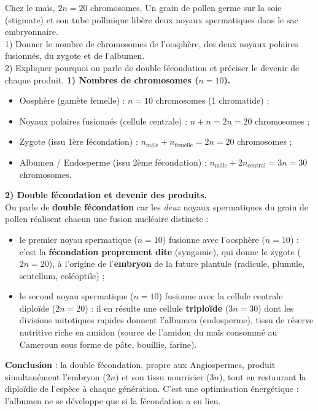 \documentclass[11pt]{article}
\newcommand{\cle}[1]{{\popxbold\color{popdark}#1}}
\begin{document}
\begin{exoresolu}
Chez le maïs, $2n = 20$ chromosomes. Un grain de pollen germe sur la soie (stigmate) et son tube pollinique libère deux noyaux spermatiques dans le sac embryonnaire.\\
1) Donner le nombre de chromosomes de l'oosphère, des deux noyaux polaires fusionnés, du zygote et de l'albumen.\\
2) Expliquer pourquoi on parle de double fécondation et préciser le devenir de chaque produit.
\tcblower
\textbf{1) Nombres de chromosomes ($n = 10$).}
\begin{itemize}
\item Oosphère (gamète femelle) : $n = 10$ chromosomes (1 chromatide) ;
\item Noyaux polaires fusionnés (cellule centrale) : $n + n = 2n = 20$ chromosomes ;
\item Zygote (issu 1ère fécondation) : $n_{\text{mâle}} + n_{\text{femelle}} = 2n = 20$ chromosomes ;
\item Albumen / Endosperme (issu 2ème fécondation) : $n_{\text{mâle}} + 2n_{\text{central}} = 3n = 30$ chromosomes.
\end{itemize}
\textbf{2) Double fécondation et devenir des produits.}\\
On parle de \textbf{double fécondation} car les \emph{deux} noyaux spermatiques du grain de pollen réalisent chacun une fusion nucléaire distincte :
\begin{itemize}
\item le premier noyau spermatique ($n = 10$) fusionne avec l'oosphère ($n = 10$) : c'est la \textbf{fécondation proprement dite} (syngamie), qui donne le \cle{zygote} ($2n = 20$), à l'origine de l'\textbf{embryon} de la future plantule (radicule, plumule, scutellum, coléoptile) ;
\item le second noyau spermatique ($n = 10$) fusionne avec la cellule centrale diploïde ($2n = 20$) : il en résulte une cellule \textbf{triploïde} ($3n = 30$) dont les divisions mitotiques rapides donnent l'\cle{albumen} (endosperme), tissu de réserve nutritive riche en amidon (source de l'amidon du maïs consommé au Cameroun sous forme de pâte, bouillie, farine).
\end{itemize}
\textbf{Conclusion} : la double fécondation, propre aux Angiospermes, produit simultanément l'embryon ($2n$) et son tissu nourricier ($3n$), tout en restaurant la diploïdie de l'espèce à chaque génération. C'est une optimisation énergétique : l'albumen ne se développe que si la fécondation a eu lieu.
\end{exoresolu}
\end{document}

